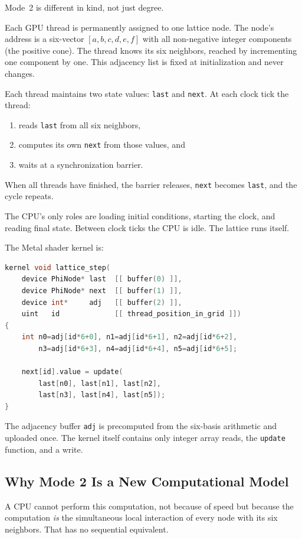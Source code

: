 \documentclass[12pt]{article}
\theoremstyle{definition}
\theoremstyle{remark}
\begin{document}
Mode~2 is different in kind, not just degree.

Each GPU thread is permanently assigned to one lattice node.  The
node's address is a six-vector $[a,b,c,d,e,f]$ with all non-negative
integer components (the positive cone).  The thread knows its six
neighbors, reached by incrementing one component by one.  This
adjacency list is fixed at initialization and never changes.

Each thread maintains two state values: \texttt{last} and \texttt{next}.
At each clock tick the thread:
\begin{enumerate}[nosep]
  \item reads \texttt{last} from all six neighbors,
  \item computes its own \texttt{next} from those values, and
  \item waits at a synchronization barrier.
\end{enumerate}
When all threads have finished, the barrier releases, \texttt{next}
becomes \texttt{last}, and the cycle repeats.

The CPU's only roles are loading initial conditions, starting the clock,
and reading final state.  Between clock ticks the CPU is idle.
The lattice runs itself.

The Metal shader kernel is:

\begin{lstlisting}[language=C]
kernel void lattice_step(
    device PhiNode* last  [[ buffer(0) ]],
    device PhiNode* next  [[ buffer(1) ]],
    device int*     adj   [[ buffer(2) ]],
    uint   id             [[ thread_position_in_grid ]])
{
    int n0=adj[id*6+0], n1=adj[id*6+1], n2=adj[id*6+2],
        n3=adj[id*6+3], n4=adj[id*6+4], n5=adj[id*6+5];

    next[id].value = update(
        last[n0], last[n1], last[n2],
        last[n3], last[n4], last[n5]);
}
\end{lstlisting}

The adjacency buffer \texttt{adj} is precomputed from the six-basis
arithmetic and uploaded once.  The kernel itself contains only integer
array reads, the \texttt{update} function, and a write.

\subsection{Why Mode 2 Is a New Computational Model}

A CPU cannot perform this computation, not because of speed but because
the computation \emph{is} the simultaneous local interaction of every
node with its six neighbors.  That has no sequential equivalent.
\end{document}
